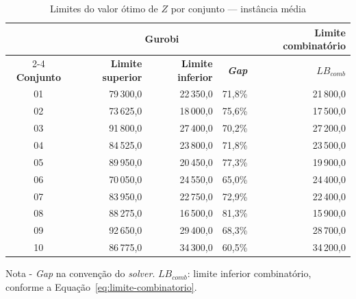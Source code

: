 \begin{table}[htbp]
    \caption{Limites do valor ótimo de $Z$ por conjunto --- instância média}
    \label{tab:res-limites-medio}
    \centering
    \begin{tabular}{crrrr}
        \hline
        & \multicolumn{3}{c}{\textbf{Gurobi}} & \textbf{Limite combinatório} \\
        \cline{2-4} \cline{5-5}
        \textbf{Conjunto} & \textbf{Limite superior} & \textbf{Limite inferior} & \textbf{\textit{Gap}} & \textbf{$LB_{comb}$} \\
        \hline
        01 & 79\,300,0 & 22\,350,0 & 71,8\% & 21\,800,0 \\
        02 & 73\,625,0 & 18\,000,0 & 75,6\% & 17\,500,0 \\
        03 & 91\,800,0 & 27\,400,0 & 70,2\% & 27\,200,0 \\
        04 & 84\,525,0 & 23\,800,0 & 71,8\% & 23\,500,0 \\
        05 & 89\,950,0 & 20\,450,0 & 77,3\% & 19\,900,0 \\
        06 & 70\,050,0 & 24\,550,0 & 65,0\% & 24\,400,0 \\
        07 & 83\,950,0 & 22\,750,0 & 72,9\% & 22\,400,0 \\
        08 & 88\,275,0 & 16\,500,0 & 81,3\% & 15\,900,0 \\
        09 & 92\,650,0 & 29\,400,0 & 68,3\% & 28\,700,0 \\
        10 & 86\,775,0 & 34\,300,0 & 60,5\% & 34\,200,0 \\
        \hline
    \end{tabular}
    \par\smallskip
    {\footnotesize Nota - \textit{Gap} na convenção do \textit{solver}. $LB_{comb}$: limite inferior combinatório, conforme a Equação~\eqref{eq:limite-combinatorio}.}
\end{table}

